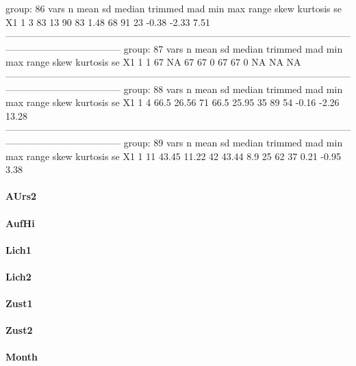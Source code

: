 \documentclass[a4paper,headsepline,footsepline,fontsize=11pt,BCOR=12mm,DIV=12]{report}
\begin{document}
group: 86
   vars n mean sd median trimmed  mad min max range  skew kurtosis   se
X1    1 3   83 13     90      83 1.48  68  91    23 -0.38    -2.33 7.51
------------------------------------------------------------------------------------------------------------------------------------------------ 
group: 87
   vars n mean sd median trimmed mad min max range skew kurtosis se
X1    1 1   67 NA     67      67   0  67  67     0   NA       NA NA
------------------------------------------------------------------------------------------------------------------------------------------------ 
group: 88
   vars n mean    sd median trimmed   mad min max range  skew kurtosis    se
X1    1 4 66.5 26.56     71    66.5 25.95  35  89    54 -0.16    -2.26 13.28
------------------------------------------------------------------------------------------------------------------------------------------------ 
group: 89
   vars  n  mean    sd median trimmed mad min max range skew kurtosis   se
X1    1 11 43.45 11.22     42   43.44 8.9  25  62    37 0.21    -0.95 3.38

\paragraph{AUrs2}

\paragraph{AufHi}

\paragraph{Lich1}

\paragraph{Lich2}

\paragraph{Zust1}

\paragraph{Zust2}

\paragraph{Month}
\end{document}
